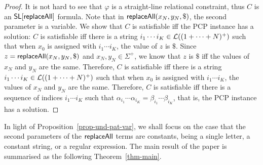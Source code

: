 \begin{proof}
It is not hard to see that $\varphi$ is a straight-line relational constraint, thus $C$ is an $\mathsf{SL}[\mathsf{replaceAll}]$ formula. Note that in $\mathsf{replaceAll}(x_N, y_N, \$)$, the second parameter is a variable. We show that $C$ is satisfiable iff the PCP instance has a solution: $C$ is satisfiable iff there is a string $i_1 \cdots i_K \in \mathcal{L}((1 + \cdots + N)^+)$ such that when $x_0$ is assigned with $i_1 \cdots i_K$, the value of $z$ is $\$$.
Since $z = \mathsf{replaceAll}(x_N, y_N, \$)$ and $x_N, y_N \in \Sigma^+$, we know that $z$ is $\$$ iff the values of $x_N$ and $y_N$ are the same. Therefore, $C$ is satisfiable iff there is a string $i_1 \cdots i_K \in \mathcal{L}((1 + \cdots + N)^+)$ such that when $x_0$ is assigned with $i_1 \cdots i_K$, the values of $x_N$ and $y_N$ are the same. Therefore, $C$ is satisfiable iff there is a sequence of indices $i_1 \cdots i_K$ such that $\alpha_{i_1} \cdots \alpha_{i_K} = \beta_{i_1} \cdots \beta_{i_K}$, that is, the PCP instance has a solution.
%
%
%
%
%
%	
%	
%	
%	
%	
\end{proof}


In light of Proposition~\ref{prop-und-pat-var}, we shall focus on the case that the second parameters of the $\mathsf{replaceAll}$ terms are constants, being a single letter, a constant string, or a regular expression. 
%
The main result of the paper is summarised as the following Theorem~\ref{thm-main}.


